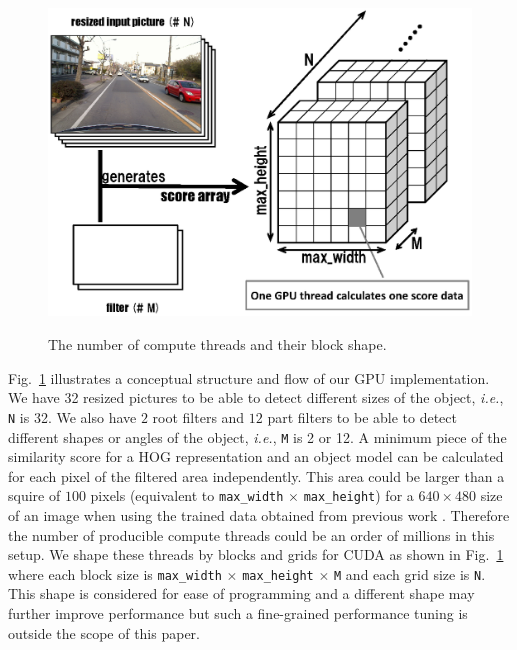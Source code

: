 \begin{figure}[t]
 \begin{center}
  \includegraphics[width=\hsize]{fig/threads_shape.eps}\\
  \caption{The number of compute threads and their block shape.}
  \label{fig:threads_shape}
 \end{center}
\end{figure}

Fig.~\ref{fig:threads_shape} illustrates a conceptual structure and flow
of our GPU implementation.
We have 32 resized pictures to be able to detect different sizes of the
object, \textit{i.e.}, \texttt{N} is 32.
We also have $2$ root filters and $12$ part filters to be able to detect
different shapes or angles of the object, \textit{i.e.}, \texttt{M} is 2
or 12.
A minimum piece of the similarity score for a HOG representation and an
object model can be calculated for each pixel of the filtered area
independently.
This area could be larger than a squire of $100$ pixels (equivalent to
\texttt{max\_width} $\times$ \texttt{max\_height}) for a $640 \times 480$
size of an image when using the trained data obtained from previous work
\cite{Niknejad12}.
Therefore the number of producible compute threads could be an order of
millions in this setup.
We shape these threads by blocks and grids for CUDA as shown in
Fig.~\ref{fig:threads_shape} where each block size is \texttt{max\_width}
$\times$ \texttt{max\_height} $\times$ \texttt{M} and each grid size is
\texttt{N}.
This shape is considered for ease of programming and a different shape
may further improve performance but such a fine-grained performance
tuning is outside the scope of this paper.


